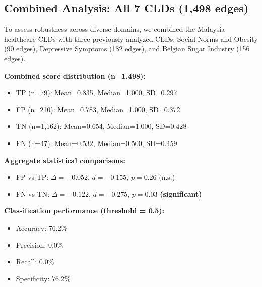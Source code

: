 \subsection{Combined Analysis: All 7 CLDs (1,498 edges)}

To assess robustness across diverse domains, we combined the Malaysia healthcare CLDs with three previously analyzed CLDs: Social Norms and Obesity (90 edges), Depressive Symptoms (182 edges), and Belgian Sugar Industry (156 edges).

\textbf{Combined score distribution (n=1,498):}
\begin{itemize}
    \item TP (n=79): Mean=0.835, Median=1.000, SD=0.297
    \item FP (n=210): Mean=0.783, Median=1.000, SD=0.372
    \item TN (n=1,162): Mean=0.654, Median=1.000, SD=0.428
    \item FN (n=47): Mean=0.532, Median=0.500, SD=0.459
\end{itemize}

\textbf{Aggregate statistical comparisons:}
\begin{itemize}
    \item FP vs TP: $\Delta = -0.052$, $d = -0.155$, $p = 0.26$ (n.s.)
    \item FN vs TN: $\Delta = -0.122$, $d = -0.275$, $p = 0.03$ \textbf{(significant)}
\end{itemize}

\textbf{Classification performance (threshold = 0.5):}
\begin{itemize}
    \item Accuracy: 76.2\%
    \item Precision: 0.0\%
    \item Recall: 0.0\%
    \item Specificity: 76.2\%
\end{itemize}

